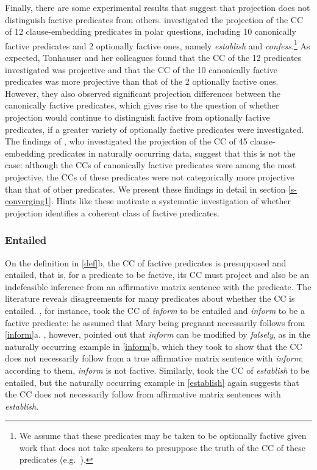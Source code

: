 \documentclass{language}
\newcommand{\6}{\mbox{$[\hspace*{-.6mm}[$}}
\newcommand{\9}{\mbox{$]\hspace*{-.6mm}]$}}
\begin{document}
Finally, there are some experimental results that suggest that projection does not distinguish factive predicates from others. \citealt{tbd-variability} investigated the projection of the CC of 12 clause-embedding predicates in polar questions, including 10 canonically factive predicates and 2 optionally factive ones, namely {\em establish} and {\em confess}.\footnote{We assume that these predicates may be taken to be optionally factive given work that does not take speakers to presuppose the truth of the CC of these predicates (e.g.\ \citealt{wyse,swanson2012,karttunen2016}).} As expected, Tonhauser and her colleagues found that the CC of the 12 predicates investigated was projective and that the CC of the 10 canonically factive predicates was more projective than that of the 2 optionally factive ones. However, they also observed significant projection differences between the canonically factive predicates, which gives rise to the question of whether projection would continue to distinguish factive from optionally factive predicates, if a greater variety of optionally factive predicates were investigated. The findings of \citet{demarneffe-etal-sub23}, who investigated the projection of the CC of 45 clause-embedding predicates in naturally occurring data, suggest that this is not the case: although the CCs of canonically factive predicates were among the most projective, the CCs of these predicates were not categorically more projective than that of other predicates. We present these findings in detail in section \ref{s-converging1}. Hints like these motivate a systematic investigation of whether projection identifies a coherent class of factive predicates.

\subsubsection{Entailed} On the definition in \ref{def}b, the CC of factive predicates is presupposed and entailed, that is, for a predicate to be factive, its CC must project and also be an indefeasible inference from an affirmative matrix sentence with the predicate. The literature reveals disagreements for many predicates about whether the CC is entailed. \citet[139]{schlenker10}, for instance, took the CC of {\em inform} to be entailed and {\em inform} to be a factive predicate: he assumed that Mary being pregnant necessarily follows from \ref{inform}a. \citet[76]{anand-hacquard2014}, however, pointed out that {\em inform} can be modified by {\em falsely}, as in the naturally occurring example in \ref{inform}b, which they took to show that the CC does not necessarily follow from a true affirmative matrix sentence with {\em inform}; according to them, {\em inform} is not factive. Similarly, \citet{swanson2012} took the CC of {\em establish} to be entailed, but the naturally occurring example in \ref{establish} again suggests that the CC does not necessarily follow from affirmative matrix sentences with {\em establish}.
\end{document}
